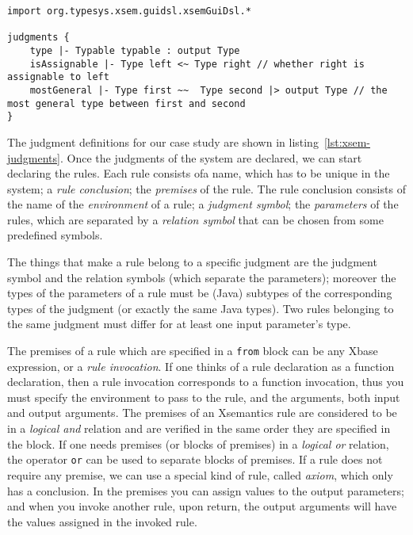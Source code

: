 \begin{lstlisting}[language=xsemantics,float,label=lst:xsem-judgments,caption=Judgment
definitions in Xsemantics]
import org.typesys.xsem.guidsl.xsemGuiDsl.*

judgments {
	type |- Typable typable : output Type 
	isAssignable |- Type left <~ Type right // whether right is assignable to left
	mostGeneral |- Type first ~~  Type second |> output Type // the most general type between first and second
}
\end{lstlisting}

The judgment definitions for our case study are shown in
listing~\ref{lst:xsem-judgments}.
Once the judgments of the system are declared, we can start declaring the rules.
 Each rule consists ofa name, which has to be unique in the system; a
\textit{rule conclusion}; the \textit{premises} of the rule.  The rule
conclusion consists of the name of the \textit{environment} of a rule; a
\textit{judgment symbol}; the \textit{parameters} of the rules, which are
separated by a \textit{relation symbol} that can be chosen from some predefined
symbols.

The things that make a rule belong to a specific judgment are the judgment
symbol and the relation symbols (which separate the parameters); moreover the
types of the parameters of a rule must be (Java) subtypes of the corresponding types
of the judgment (or exactly the same Java types).  Two rules belonging to the
same judgment must differ for at least one input parameter's type.

The premises of a rule which are specified in a \verb|from| block can be any
Xbase expression, or a \emph{rule invocation}.  If one thinks of a rule
declaration as a function declaration, then a rule invocation corresponds to a
function invocation, thus you must specify the environment to pass to the rule,
and the arguments, both input and output arguments.
The premises of an Xsemantics rule are considered to be in a \emph{logical and}
relation and are verified in the same order they are specified in the block.
If one needs premises (or blocks of premises) in a \emph{logical or} relation,
the operator \verb|or| can be used to separate blocks of premises.
If a rule does not require any premise, we can use a special kind of rule,
called \textit{axiom}, which only has a conclusion.
In the premises you can assign values to the output parameters; and when you
invoke another rule, upon return, the output arguments will have the values
assigned in the invoked rule.

